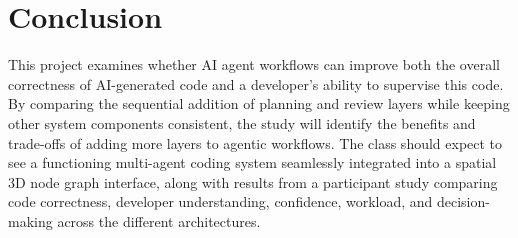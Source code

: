\documentclass{chi-ext}
\begin{document}
\section{Conclusion}
This project examines whether AI agent workflows can improve both the overall correctness of AI-generated code and a developer's ability to supervise this code. By comparing the sequential addition of planning and review layers while keeping other system components consistent, the study will identify the benefits and trade-offs of adding more layers to agentic workflows. The class should expect to see a functioning multi-agent coding system seamlessly integrated into a spatial 3D node graph interface, along with results from a participant study comparing code correctness, developer understanding, confidence, workload, and decision-making across the different architectures.

\nocite{*}
\balance


\end{document}
